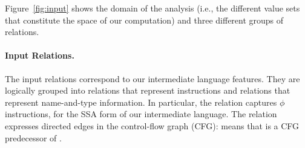 Figure~\ref{fig:input} shows the domain of the analysis (i.e., the
different value sets that constitute the space of our computation) and
three different groups of relations. 

\paragraph{Input Relations.}
The input relations correspond to our intermediate language features.  They are
logically grouped into relations that represent instructions and relations that
represent name-and-type information.
In particular, the  relation captures
$\phi$ instructions, for the SSA form of our intermediate language. The
 relation expresses directed edges in the control-flow graph
(CFG):  means that  is a CFG predecessor of .

